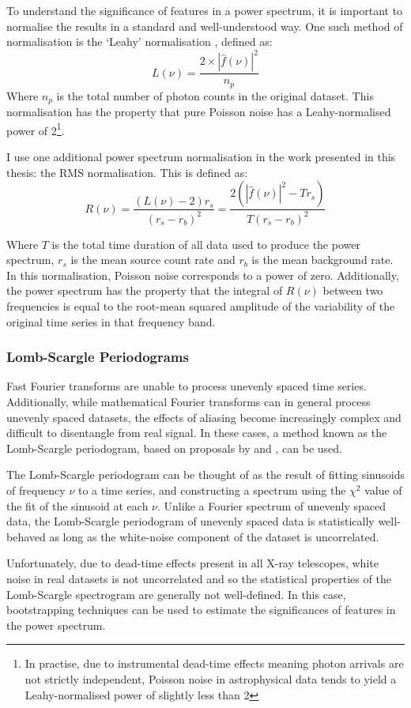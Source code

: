\par To understand the significance of features in a power spectrum, it is important to normalise the results in a standard and well-understood way.  One such method of normalisation is the `Leahy' normalisation \citep{Leahy_Norm}, defined as:
\begin{equation}
L(\nu)=\frac{2\times|\hat{f}(\nu)|^2}{n_{p}}
\end{equation}
Where $n_p$ is the total number of photon counts in the original dataset.  This normalisation has the property that pure Poisson noise has a Leahy-normalised power of 2\footnote{In practise, due to instrumental dead-time effects meaning photon arrivals are not strictly independent, Poisson noise in astrophysical data tends to yield a Leahy-normalised power of slightly less than 2}.
\par I use one additional power spectrum normalisation in the work presented in this thesis: the RMS normalisation.  This is defined as:
\begin{equation}
R(\nu)=\frac{(L(\nu)-2)r_s}{(r_s-r_b)^2}=\frac{2\left(|\hat{f}(\nu)|^2-Tr_s\right)}{T(r_s-r_b)^2}
\end{equation}
\par Where $T$ is the total time duration of all data used to produce the power spectrum, $r_s$ is the mean source count rate and $r_b$ is the mean background rate.  In this normalisation, Poisson noise corresponds to a power of zero.  Additionally, the power spectrum has the property that the integral of $R(\nu)$ between two frequencies is equal to the root-mean squared amplitude of the variability of the original time series in that frequency band.

\subsubsection{Lomb-Scargle Periodograms}

\par Fast Fourier transforms are unable to process unevenly spaced time series.  Additionally, while mathematical Fourier transforms can in general process unevenly spaced datasets, the effects of aliasing become increasingly complex and difficult to disentangle from real signal.  In these cases, a method known as the Lomb-Scargle periodogram, based on proposals by \citet{Lomb_LombScargle} and \citet{Scargle_LombScargle}, can be used.
\par The Lomb-Scargle periodogram can be thought of as the result of fitting sinusoids of frequency $\nu$ to a time series, and constructing a spectrum using the $\chi^2$ value of the fit of the sinusoid at each $\nu$.  Unlike a Fourier spectrum of unevenly spaced data, the Lomb-Scargle periodogram of unevenly spaced data is statistically well-behaved as long as the white-noise component of the dataset is uncorrelated.
\par Unfortunately, due to dead-time effects present in all X-ray telescopes, white noise in real datasets is not uncorrelated and so the statistical properties of the Lomb-Scargle spectrogram are generally not well-defined.  In this case, bootstrapping techniques can be used to estimate the significances of features in the power spectrum.

